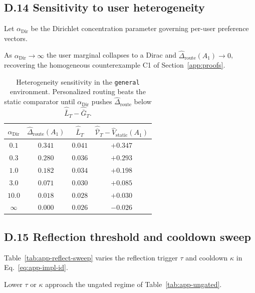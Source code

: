 \documentclass{article} %
\begin{document}
\subsection{D.14 Sensitivity to user heterogeneity}

\label{app:tab-alpha}

Let $\alpha_{\mathrm{Dir}}$ be the Dirichlet concentration parameter governing per-user preference vectors.

As $\alpha_{\mathrm{Dir}} \to \infty$ the user marginal collapses to a Dirac and $\widehat\Delta_{\mathrm{route}}(A_1) \to 0$, recovering the homogeneous counterexample C1 of Section~\ref{app:proofs}.

\begin{table}[h]
\centering
\small
\begin{tabular}{cccc}
\toprule
$\alpha_{\mathrm{Dir}}$ & $\widehat\Delta_{\mathrm{route}}(A_1)$ & $\widehat{\bar L}_T$ & $\widehat{\bar{\mathcal V}}_T - \widehat V_{\mathrm{static}}(A_1)$ \\
\midrule
$0.1$  & $0.341$ & $0.041$ & $+0.347$ \\
$0.3$  & $0.280$ & $0.036$ & $+0.293$ \\
$1.0$  & $0.182$ & $0.034$ & $+0.198$ \\
$3.0$  & $0.071$ & $0.030$ & $+0.085$ \\
$10.0$ & $0.018$ & $0.028$ & $+0.030$ \\
$\infty$ & $0.000$ & $0.026$ & $-0.026$ \\
\bottomrule
\end{tabular}
\caption{Heterogeneity sensitivity in the \texttt{general} environment. Personalized routing beats the static comparator until $\alpha_{\mathrm{Dir}}$ pushes $\widehat\Delta_{\mathrm{route}}$ below $\widehat{\bar L}_T - \widehat{\bar G}_T$.}
\label{tab:app-alpha}
\end{table}

\subsection{D.15 Reflection threshold and cooldown sweep}

\label{app:tab-reflect-sweep}

Table~\ref{tab:app-reflect-sweep} varies the reflection trigger $\tau$ and cooldown $\kappa$ in Eq.~\eqref{eq:app-impl-id}.

Lower $\tau$ or $\kappa$ approach the ungated regime of Table~\ref{tab:app-ungated}.
\end{document}
